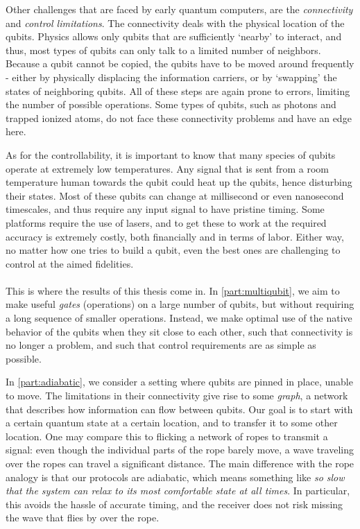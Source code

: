 Other challenges that are faced by early quantum computers, are the \emph{connectivity} and \emph{control limitations}. The connectivity deals with the physical location of the qubits. Physics allows only qubits that are sufficiently `nearby' to interact, and thus, most types of qubits can only talk to a limited number of neighbors. Because a qubit cannot be copied, the qubits have to be moved around frequently - either by physically displacing the information carriers, or by `swapping' the states of neighboring qubits. All of these steps are again prone to errors, limiting the number of possible operations. Some types of qubits, such as photons and trapped ionized atoms, do not face these connectivity problems and have an edge here. 

As for the controllability, it is important to know that many species of qubits operate at extremely low temperatures. Any signal that is sent from a room temperature human towards the qubit could heat up the qubits, hence disturbing their states. Most of these qubits can change at millisecond or even nanosecond timescales, and thus require any input signal to have pristine timing. Some platforms require the use of lasers, and to get these to work at the required accuracy is extremely costly, both financially and in terms of labor. Either way, no matter how one tries to build a qubit, even the best ones are challenging to control at the aimed fidelities. 

\paragraph{} This is where the results of this thesis come in. In \cref{part:multiqubit}, we aim to make useful \emph{gates} (operations) on a large number of qubits, but without requiring a long sequence of smaller operations. Instead, we make optimal use of the native behavior of the qubits when they sit close to each other, such that connectivity is no longer a problem, and such that control requirements are as simple as possible. 

In \cref{part:adiabatic}, we consider a setting where qubits are pinned in place, unable to move. The limitations in their connectivity give rise to some \emph{graph}, a network that describes how information can flow between qubits. Our goal is to start with a certain quantum state at a certain location, and to transfer it to some other location.  One may compare this to flicking a network of ropes to transmit a signal: even though the individual parts of the rope barely move, a wave traveling over the ropes can travel a significant distance. The main difference with the rope analogy is that our protocols are adiabatic, which means something like \emph{so slow that the system can relax to its most comfortable state at all times}. In particular, this avoids the hassle of accurate timing, and the receiver does not risk missing the wave that flies by over the rope. 

